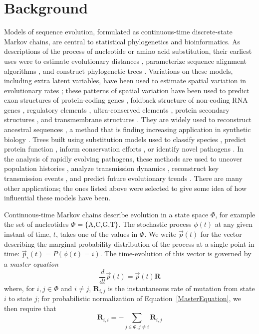 \documentclass{bmcart}
\newcommand{\matr}[1]{\mathbf{#1}}
\newcommand{\eqref}[1]{Equation~\ref{#1}}
\newcommand{\statespace}{\Phi}
\newcommand{\state}{\phi}
\newcommand{\statevec}{\vec{p}}
\newcommand{\ratematrix}{\matr{R}}
\begin{document}
\section*{Background}

Models of sequence evolution, formulated as continuous-time discrete-state Markov chains,
are central to statistical phylogenetics and bioinformatics.
As descriptions of the process of nucleotide or amino acid substitution,
their earliest uses were to estimate evolutionary distances \cite{JukesCantor69},
parameterize sequence alignment algorithms \cite{DayhoffEtal72},
and construct phylogenetic trees \cite{Felsenstein81}.
Variations on these models, including extra latent variables,
have been used to estimate spatial variation in evolutionary rates \cite{Yang93,Yang94};
these patterns of spatial variation have been used to
predict exon structures of protein-coding genes \cite{PedersenHein2003,SiepelHaussler04b},
foldback structure of non-coding RNA genes \cite{PedersenEtAl2006,PollardEtAl2006},
regulatory elements \cite{PedersenEtAl04},
ultra-conserved elements \cite{SiepelEtAl2005},
protein secondary structures \cite{GoldmanEtAl96},
and transmembrane structures \cite{LioGoldman99}.
They are widely used to reconstruct ancestral sequences \cite{BlanchetteEtAl2004,UgaldeEtAl2004,Liberles2007,OrtlundEtAl2007,GaucherEtAl2008,AshkenazyEtAl2012,AlcolombriEtAl2011,SantiagoOrtizEtAl2015,ZakasEtAl2016},
a method that is finding increasing application in synthetic biology \cite{Liberles2007,AlcolombriEtAl2011,SantiagoOrtizEtAl2015,ZakasEtAl2016}.
Trees built using substitution models used to classify species \cite{pmid26385966},
predict protein function \cite{EngelhardtEtAl2005},
inform conservation efforts \cite{pmid25561668},
or identify novel pathogens \cite{pmid12690091}.
In the analysis of rapidly evolving pathogens, these methods are used to
uncover population histories \cite{pmid15703244},
analyze transmission dynamics \cite{pmid22927414},
reconstruct key transmission events \cite{pmid27783600},
and predict future evolutionary trends \cite{pmid27774306}.
There are many other applications;
the ones listed above were selected to give some idea of how influential these models have been.

Continuous-time Markov chains describe evolution in a state space $\statespace$,
for example the set of nucleotides $\statespace = \{ \mbox{A,C,G,T} \}$.
The stochastic process $\state(t)$ at any given instant of time, $t$,
takes one of the values in $\statespace$.
We write $\statevec(t)$ for the vector describing the marginal probability distribution of the process
at a single point in time:
$\statevec_i(t) = P(\state(t) = i)$.
The time-evolution of this vector is governed by a {\em master equation}
\begin{equation}
\frac{d}{dt} \statevec(t) = \statevec(t) \ratematrix
\label{MasterEquation}
\end{equation}
where, for $i,j \in \statespace$ and $i \neq j$,
$\ratematrix_{i,j}$ is the instantaneous rate of mutation from state $i$ to state $j$;
for probabilistic normalization of \eqref{MasterEquation},
we then require that
\[
\ratematrix_{i,i} = -\sum_{j \in \statespace, j \neq i} \ratematrix_{i,j}
\]
\end{document}
